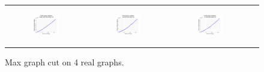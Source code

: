 \begin{figure}[ht]
\begin{tabular}{cccc}
	  \begin{subfigure}[b]{0.22\textwidth}
	  	\includegraphics[width=110pt]{images/validated_CC2G_arabic2005_maxgraphcut.png}
			\caption{}
			\label{appfig:validated_CC2G_arabic2005_maxgraphcut}
	  \end{subfigure} &
	  \begin{subfigure}[b]{0.22\textwidth}
	  	\includegraphics[width=110pt]{images/validated_CC2G_uk2005_maxgraphcut.png}
			\caption{}
			\label{appfig:validated_CC2G_uk2005_maxgraphcut}
	  \end{subfigure} &
	  \begin{subfigure}[b]{0.22\textwidth}
	  	\includegraphics[width=110pt]{images/validated_CC2G_it2004_maxgraphcut.png}
			\caption{}
			\label{appfig:validated_CC2G_it2004_maxgraphcut}
	  \end{subfigure} \\
  \end{tabular}
  \caption{Max graph cut on 4 real graphs.}
\end{figure}





